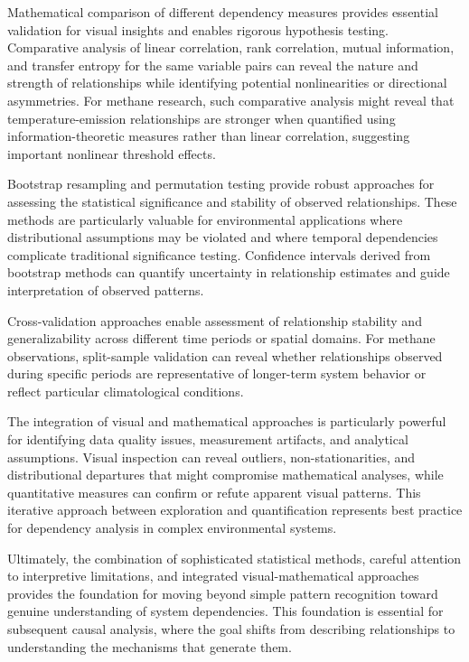 Mathematical comparison of different dependency measures provides essential validation for visual insights and enables rigorous hypothesis testing. Comparative analysis of linear correlation, rank correlation, mutual information, and transfer entropy for the same variable pairs can reveal the nature and strength of relationships while identifying potential nonlinearities or directional asymmetries. For methane research, such comparative analysis might reveal that temperature-emission relationships are stronger when quantified using information-theoretic measures rather than linear correlation, suggesting important nonlinear threshold effects.

Bootstrap resampling and permutation testing provide robust approaches for assessing the statistical significance and stability of observed relationships. These methods are particularly valuable for environmental applications where distributional assumptions may be violated and where temporal dependencies complicate traditional significance testing. Confidence intervals derived from bootstrap methods can quantify uncertainty in relationship estimates and guide interpretation of observed patterns.

Cross-validation approaches enable assessment of relationship stability and generalizability across different time periods or spatial domains. For methane observations, split-sample validation can reveal whether relationships observed during specific periods are representative of longer-term system behavior or reflect particular climatological conditions.

The integration of visual and mathematical approaches is particularly powerful for identifying data quality issues, measurement artifacts, and analytical assumptions. Visual inspection can reveal outliers, non-stationarities, and distributional departures that might compromise mathematical analyses, while quantitative measures can confirm or refute apparent visual patterns. This iterative approach between exploration and quantification represents best practice for dependency analysis in complex environmental systems.

Ultimately, the combination of sophisticated statistical methods, careful attention to interpretive limitations, and integrated visual-mathematical approaches provides the foundation for moving beyond simple pattern recognition toward genuine understanding of system dependencies. This foundation is essential for subsequent causal analysis, where the goal shifts from describing relationships to understanding the mechanisms that generate them.



